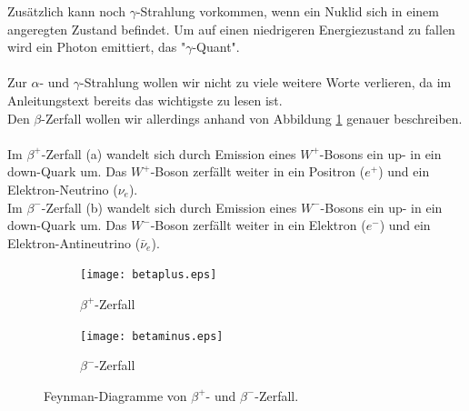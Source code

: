 \documentclass{article}
\begin{document}
Zusätzlich kann noch $\gamma$-Strahlung vorkommen, wenn ein Nuklid sich in einem angeregten Zustand befindet. Um auf einen niedrigeren Energiezustand zu fallen wird ein Photon emittiert, das "$\gamma$-Quant". \\
\\
Zur $\alpha$- und $\gamma$-Strahlung wollen wir nicht zu viele weitere Worte verlieren, da im Anleitungstext bereits das wichtigste zu lesen ist.\\
Den $\beta$-Zerfall wollen wir allerdings anhand von Abbildung \ref{fig:beta} genauer beschreiben.\\
\\
Im $\beta^+$-Zerfall (a) wandelt sich durch Emission eines $W^+$-Bosons ein up- in ein down-Quark um. Das $W^+$-Boson zerfällt weiter in ein Positron ($e^+$) und ein Elektron-Neutrino ($\nu_e$). \\
Im $\beta^-$-Zerfall (b) wandelt sich durch Emission eines $W^-$-Bosons ein up- in ein down-Quark um. Das $W^-$-Boson zerfällt weiter in ein Elektron ($e^-$) und ein Elektron-Antineutrino ($\bar{\nu}_e$). 

\begin{center}
\begin{figure}[H]
\begin{subfigure}{0.5\textwidth}
\texttt{[image: betaplus.eps]}
\caption{$\beta^+$-Zerfall}
\end{subfigure}
\begin{subfigure}{0.5\textwidth}
\texttt{[image: betaminus.eps]}
\caption{$\beta^-$-Zerfall}
\end{subfigure}
\caption{Feynman-Diagramme von $\beta^+$- und $\beta^-$-Zerfall.}
\label{fig:beta}
\end{figure}
\end{center}
\end{document}
